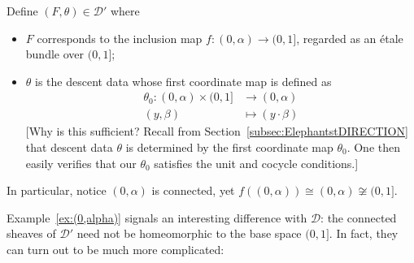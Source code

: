 \documentclass[a4paper, 11pt,reqno]{amsart}
\newcommand{\D}{\mathcal{D}}
\begin{document}
\begin{example}\label{ex:(0,alpha)} Define $(F,\theta)\in\D'$ where
	\begin{itemize}
		\item $F$ corresponds to the inclusion map $f\colon (0,\alpha)\to(0,1]$, regarded as an \'{e}tale bundle over $(0,1]$;
		\item $\theta$ is the descent data whose first coordinate map is defined as
		\begin{align}\label{eq:theta0LAXsheaf}
		\theta_0\colon (0,\alpha) \times (0,1] & \longrightarrow (0,\alpha)\\
		(y,\beta) &\longmapsto (y\cdot\beta) \nonumber
		\end{align}
		[Why is this sufficient? Recall from Section~\ref{subsec:ElephantstDIRECTION} that descent data $\theta$ is determined by the first coordinate map $\theta_0$. One then easily verifies that our $\theta_0$ satisfies the unit and cocycle conditions.]
	\end{itemize} 
In particular, notice $(0,\alpha)$ is connected, yet $f((0,\alpha))\cong(0,\alpha)\not\cong(0,1]$. %
\end{example}

Example~\ref{ex:(0,alpha)} signals an interesting difference with $\D$: the connected sheaves of $\D'$ need not be homeomorphic to the base space $(0,1]$. In fact, they can turn out to be much more complicated:
\end{document}
